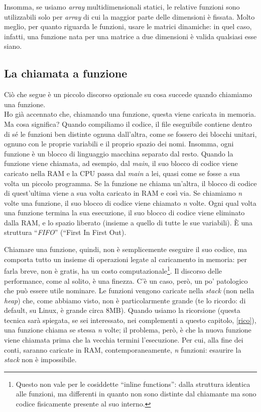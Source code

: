 Insomma, se usiamo \emph{array} multidimensionali statici, le relative funzioni sono utilizzabili solo per \emph{array} di cui la maggior parte delle dimensioni è fissata. Molto meglio, per quanto riguarda le funzioni, usare le matrici dinamiche: in quel caso, infatti, una funzione nata per una matrice a due dimensioni è valida qualsiasi esse siano.
\begin{small}
\section{La chiamata a funzione}
Ciò che segue è un piccolo discorso opzionale su cosa succede quando chiamiamo una funzione.\\

 Ho già accennato che, chiamando una funzione, questa viene caricata in memoria. Ma cosa significa? Quando compiliamo il codice, il file eseguibile contiene dentro di sé le funzioni ben distinte ognuna dall'altra, come se fossero dei blocchi unitari, ognuno con le proprie variabili e il proprio spazio dei nomi. Insomma, ogni funzione è un blocco di linguaggio macchina separato dal resto. Quando la funzione viene chiamata, ad esempio, dal \emph{main}, il suo blocco di codice viene caricato nella RAM e la CPU passa dal \emph{main} a lei, quasi come se fosse a sua volta un piccolo programma. Se la funzione ne chiama un'altra, il blocco di codice di quest'ultima viene a sua volta caricato in RAM e così via. Se chiamiamo \emph{n} volte una funzione, il suo blocco di codice viene chiamato \emph{n} volte. Ogni qual volta una funzione termina la sua esecuzione, il suo blocco di codice viene eliminato dalla RAM, e lo spazio liberato (insieme a quello di tutte le sue variabili). È una struttura ``\emph{FIFO}'' (``First In First Out). 

Chiamare una funzione, quindi, non è semplicemente eseguire il suo codice, ma comporta tutto un insieme di operazioni  legate al caricamento in memoria: per farla breve, non è gratis, ha un costo computazionale\footnote{Questo non vale per le cosiddette ``inline functions'': dalla struttura identica alle funzioni, ma differenti in quanto non sono distinte dal chiamante ma sono codice fisicamente presente al suo interno.}. Il discorso delle performance, come al solito, è una finezza.  C'è un caso, però, un po' patologico che può essere utile nominare. Le funzioni vengono caricate nella \emph{stack} (non nella \emph{heap}) che, come abbiamo visto, non è particolarmente grande (te lo ricordo: di default, su Linux, è grande circa 8MB). Quando usiamo la ricorsione (questa tecnica sarà spiegata, se sei interessato, nei complementi a questo capitolo, \ref{rico}), una funzione chiama se stessa \emph{n} volte; il problema, però, è che la nuova funzione viene chiamata prima che la vecchia termini l'esecuzione. Per cui, alla fine dei conti, saranno caricate in RAM, contemporaneamente, \emph{n} funzioni: esaurire la \emph{stack} non è impossibile. 


\end{small}
